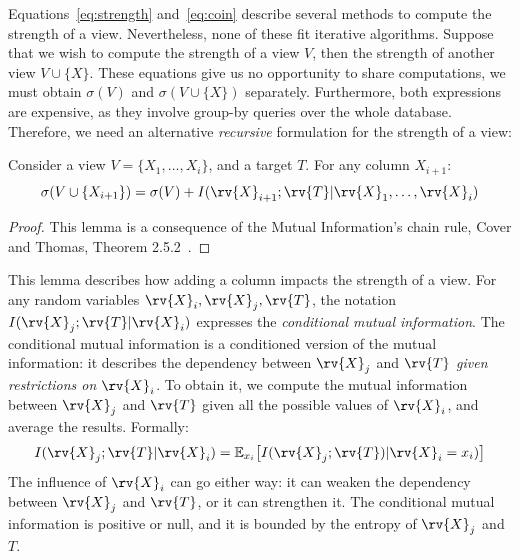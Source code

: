 Equations~\ref{eq:strength} and~\ref{eq:coin} describe several methods to
compute the strength of a view. Nevertheless, none of these fit ite\-rative 
algorithms.  Suppose that we wish to compute the strength of a view $V$, 
then the strength of another view $V \cup \{X\}$. These equations give us no
opportunity to share computations, we must obtain $\sigma(V)$ and $\sigma(V
\cup \{X\})$ separately. Furthermore, both expressions are expensive, as they
involve group-by queries over the whole database. Therefore, we need an
alternative \emph{recursive} formulation for the strength of a view:
\begin{lemma}\label{lem:chain}
Consider a view $V = \{X_1, \ldots, X_i\}$, and a target $T$.
For any column $X_{i+1}$: 
\begin{equation}\label{eq:bonus}
    \sigma(V \cup \{X_{i+1}\}) =  \sigma(V) + I(\rv{X}_{i+1} ; \rv{T} | \rv{X}_1 , \ldots, \rv{X}_i)
\end{equation}
\end{lemma}
\begin{proof}
This lemma is a consequence of the Mutual Information's chain rule,
Cover and Thomas, Theorem 2.5.2~\cite{cover2012elements}.
\end{proof}
This lemma describes how adding a column impacts the strength of a view.  For
any random variables $\rv{X}_i, \rv{X}_j, \rv{T}$, the notation
$I(\rv{X}_j;\rv{T}|\rv{X}_i)$  expresses the \emph{conditional mutual
information}. The conditional mutual information is a conditioned version of
the mutual information: it describes the dependency between $\rv{X}_j$ and
$\rv{T}$ \emph{given restrictions on $\rv{X}_i$}. To obtain it, we compute the
mutual information between $\rv{X}_j$ and $\rv{T}$ given all the possible
values of $\rv{X}_i$, and average the results. Formally:
\begin{equation}\label{eq:condmutinfo}
    I(\rv{X}_j;\rv{T}|\rv{X}_i) = \mathbb{E}_{x_i}\big[ I(\rv{X}_j; \rv{T})| \rv{X}_i = x_i)  \big]
\end{equation}
The influence of $\rv{X}_i$ can go either way: it can weaken the dependency between
$\rv{X}_j$ and $\rv{T}$, or it can strengthen it. The conditional mutual information is
positive or null, and it is bounded by the entropy of $\rv{X}_j$ and $T$. 

